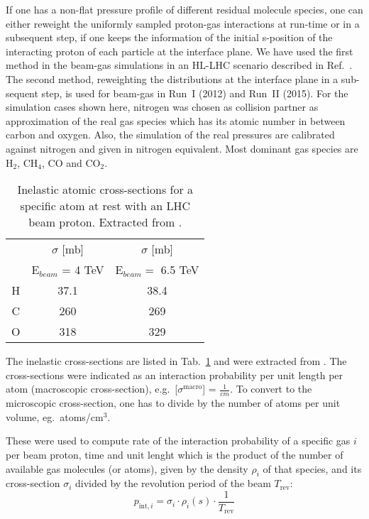 If one has a non-flat pressure profile of different residual molecule species, one can either reweight the uniformly sampled proton-gas interactions at run-time or in a subsequent step, if one keeps the information of the initial s-position of the interacting proton of each particle at the interface plane. We have used the first method in the beam-gas simulations in an HL-LHC scenario described in Ref.~\cite{kweeIpac14}. The second method, reweighting the distributions at the interface plane in a sub-sequent step, is used for beam-gas in Run~I (2012) and Run~II (2015). For the simulation cases shown here, nitrogen was chosen as collision partner as approximation of the real gas species which has its atomic number in between carbon and oxygen. Also, the simulation of the real pressures are calibrated against nitrogen and given in nitrogen equivalent. Most dominant gas species are H$_2$, CH$_4$, CO and CO$_2$.

\begin{table}
   \centering
   \caption{Inelastic atomic cross-sections for a specific atom at rest with an LHC beam proton. Extracted from \fluka.}
   \begin{tabular}{c|c|c}\hline
     &  $\sigma$ [mb] &  $\sigma$ [mb] \\
       & E$_{beam}$ = 4 TeV   & E$_{beam} =$ 6.5 TeV \\ \hline\hline
       H & 37.1 & 38.4 \\
       C & 260& 269 \\
       O & 318 & 329 \\
       \hline
   \end{tabular}
   \label{tab:atomicXsections}
\end{table}

The inelastic cross-sections are listed in Tab.~\ref{tab:atomicXsections} and were extracted from \fluka. The cross-sections were indicated as an interaction probability per unit length per atom (macroscopic cross-section), e.g.~[$\sigma^{\textrm{macro}}$] = $\frac{1}{cm}$. To convert to the microscopic cross-section, one has to divide by the number of atoms per unit volume, eg.~atoms/cm$^3$.

These were used to compute rate of the interaction probability of a specific gas $i$ per beam proton, time and unit lenght which is the product of the number of available gas molecules (or atoms), given by the density $\rho_i$ of that species, and its cross-section $\sigma_i$ divided by the revolution period of the beam $T_{\mathrm{rev}}$:
\begin{equation} \label{eq2}
p_{\mathrm{int},i} = \sigma_{i} \cdot \rho_{i}(s) \cdot \frac{1}{T_{\mathrm{rev}}}
\end{equation}


